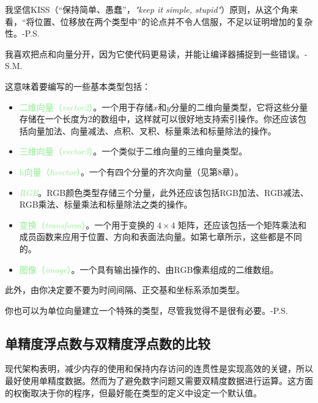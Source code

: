 \documentclass[lang=cn,12pt]{elegantbook}
\begin{document}
\begin{note}
  我坚信KISS（“保持简单、愚蠢”，\textit{"keep it simple, stupid"}）原则，从这个角来看，“将位置、位移放在两个类型中”的论点并不令人信服，不足以证明增加的复杂性。-P.S.
\end{note}

\begin{note}
  我喜欢把点和向量分开，因为它使代码更易读，并能让编译器捕捉到一些错误。-S.M.
\end{note}

这意味着要编写的一些基本类型包括：

\begin{itemize}
  \item \textcolor{lightgreen}{二维向量（\textit{vector2}）}。一个用于存储$x$和$y$分量的二维向量类型，它将这些分量存储在一个长度为2的数组中，这样就可以很好地支持索引操作。你还应该包括向量加法、向量减法、点积、叉积、标量乘法和标量除法的操作。
  \item \textcolor{lightgreen}{三维向量（\textit{vector3}）}。一个类似于二维向量的三维向量类型。
  \item \textcolor{lightgreen}{h向量（\textit{hvector}）}。一个有四个分量的齐次向量（见第8章）。
  \item \textcolor{lightgreen}{\textit{RGB}}。RGB颜色类型存储三个分量，此外还应该包括RGB加法、RGB减法、RGB乘法、标量乘法和标量除法之类的操作。
  \item \textcolor{lightgreen}{变换（\textit{transform}）}。一个用于变换的 $4 \times 4$ 矩阵，还应该包括一个矩阵乘法和成员函数来应用于位置、方向和表面法向量。如第七章所示，这些都是不同的。
  \item \textcolor{lightgreen}{图像（\textit{image}）}。一个具有输出操作的、由RGB像素组成的二维数组。
\end{itemize}

此外，由你决定要不要为时间间隔、正交基和坐标系添加类型。

\begin{note}
  你也可以为单位向量建立一个特殊的类型，尽管我觉得不是很有必要。-P.S.
\end{note}

\subsection{单精度浮点数与双精度浮点数的比较 }

现代架构表明，减少内存的使用和保持内存访问的连贯性是实现高效的关键，所以最好使用单精度数据。然而为了避免数字问题又需要双精度数据进行运算。这方面的权衡取决于你的程序，但最好能在类型的定义中设定一个默认值。
\end{document}
